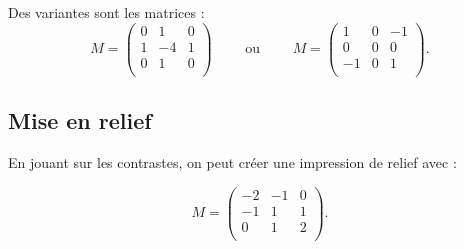 \documentclass[11pt,class=report,crop=false]{standalone}
\begin{document}
Des variantes sont les matrices : 
$$M = 
\begin{pmatrix}
0&1&0\\
1&-4&1\\
0&1&0\\
\end{pmatrix} \qquad \text{ ou } \qquad
M = \begin{pmatrix}
1&0&-1\\
0&0&0\\
-1&0&1\\
\end{pmatrix}.$$


\subsection{Mise en relief}

En jouant sur les contrastes, on peut créer une impression de relief avec : 

$$M = 
\begin{pmatrix}
-2&-1&0\\
-1&1&1\\
0&1&2\\
\end{pmatrix}.$$
\end{document}
